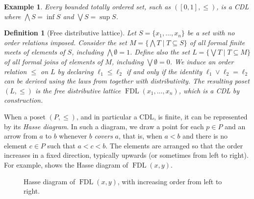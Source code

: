 \documentclass[a4paper,10pt]{article}
\newtheorem{definition}[theorem]{Definition}
\newtheorem{example}[theorem]{Example}
\DeclareMathOperator{\fdl}{FDL}
\begin{document}
\begin{example}
\label{exa:totally}
Every bounded totally ordered set, such as \(([0,1],\leq)\), is a CDL where \(\bigwedge S = \inf S\) and \(\bigvee S = \sup S\).
\end{example}

\begin{definition}[Free distributive lattice]
\label{def:fdl}
Let \(S=\{x_1,\ldots,x_n\}\) be a set with no order relations imposed. Consider the set \(M=\{\bigwedge T \mid T \subseteq S\}\) of all formal finite meets of elements of \(S\), including \(\bigwedge \emptyset = 1\). Define also the set \(L=\{\bigvee T \mid T \subseteq M\}\) of all formal joins of elements of \(M\), including \(\bigvee \emptyset = 0\). We induce an order relation \(\leq\) on \(L\) by declaring \(\ell_1 \leq \ell_2\) if and only if the identity \(\ell_1 \vee \ell_2 = \ell_2\) can be derived using the laws from  together with distributivity. The resulting poset \((L,\leq)\) is the \emph{free distributive lattice} \(\fdl(x_1,\ldots,x_n)\), which is a CDL by construction.
\end{definition}

When a poset \((P,\leq)\), and in particular a CDL, is finite, it can be represented by its \emph{Hasse diagram}. In such a diagram, we draw a point for each \(p \in P\) and an arrow from \(a\) to \(b\) whenever \(b\) \emph{covers} \(a\), that is, when \(a < b\) and there is no element \(c \in P\) such that \(a < c < b\). The elements are arranged so that the order increases in a fixed direction, typically upwards (or sometimes from left to right). For example,  shows the Hasse diagram of \(\fdl(x,y)\).

\begin{figure}
\centering
{}
\caption{Hasse diagram of \(\fdl(x,y)\), with increasing order from left to right.}
\label{fig:f2lattice}
\end{figure}
\end{document}
